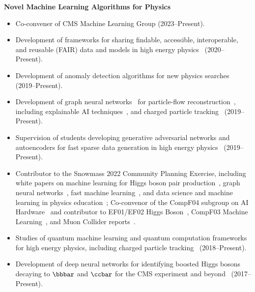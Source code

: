 \documentclass[11pt]{res}
\begin{document}
\begin{resume}
  \textbf{Novel Machine Learning Algorithms for Physics}
  \begin{itemize}
    \itemsep-0.3em
    \item Co-convener of CMS Machine Learning Group ({2023--Present}).
    \item Development of frameworks for sharing findable, accessible, interoperable, and reusable (FAIR) data and models in high energy physics~\cite{Kansal:2023joss,Huerta:2022kgj,Duarte:2022job,Chen:2021euv} ({2020--Present}).
    \item Development of anomaly detection algorithms for new physics searches~\cite{CMS-DP-2023-079,Hao:2022zns,Govorkova:2021utb,Jawahar:2021vyu,Aarrestad:2021oeb,Tsan:2021brw,Kasieczka:2021xcg,Wozniak:2020} ({2019--Present}).
    \item Development of graph neural networks~\cite{Duarte:2020ngm} for particle-flow reconstruction~\cite{Pata:2023rhh,Mokhtar:2023fzl,CMS-DP-2022-061,Pata:2022wam,CMS-DP-2021-030,Pata:2021oez}, including explainable AI techniques~\cite{Mokhtar:2022pwm,Mokhtar:2021bkf}, and charged particle tracking~\cite{Huang:2023bny,Elabd:2021lgo,Dezoort:2021kfk,Heintz:2020soy} ({2019--Present}).
    \item Supervision of students developing generative adversarial networks and autoencoders for fast sparse data generation in high energy physics~\cite{Li:2023xhj,Kansal:2022spb,Touranakou:2022qrp,Kansal:2021cqp,Orzari:2021suh,Kansal:2020svm} ({2019--Present}).
    \item Contributor to the Snowmass 2022 Community Planning Exercise, including white papers on machine learning for Higgs boson pair production~\cite{Apresyan:2022tqw}, graph neural networks~\cite{Thais:2022iok}, fast machine learning~\cite{Harris:2022qtm}, and data science and machine learning in physics education~\cite{Benelli:2022sqn}; Co-convenor of the CompF04 subgroup on AI Hardware~\cite{Bhimij:2022xyn} and contributor to EF01/EF02 Higgs Boson~\cite{Dawson:2022zbb}, CompF03 Machine Learning~\cite{Shanahan:2022ifi}, and Muon Collider reports~\cite{Black:2022cth}.
    \item Studies of quantum machine learning and quantum computation frameworks for high energy physics, including charged particle tracking~\cite{Zlokapa:2019tkn} ({2018--Present}).
    \item Development of deep neural networks for identifying boosted Higgs bosons decaying to $\bbbar$ and $\ccbar$ for the CMS experiment and beyond~\cite{CMS-DP-2022-041,Moreno:2019neq,Moreno:2019bmu,neurips2019_hbb,CMS-DP-2018-046} ({2017--Present}).
  \end{itemize}


\end{resume}
\end{document}
